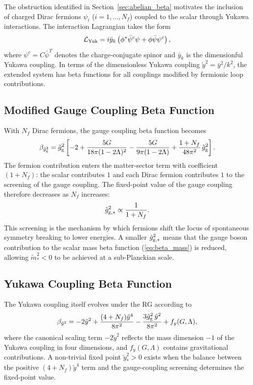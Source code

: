 \documentclass[12pt,a4paper]{article}
\begin{document}
The obstruction identified in Section~\ref{sec:abelian_beta} motivates the
inclusion of charged Dirac fermions $\psi_i$ ($i = 1,\ldots,N_f$) coupled to
the scalar through Yukawa interactions. The interaction Lagrangian takes the
form \cite{EichhornLinoMiqueleto2023}
\begin{equation}
\mathcal{L}_{\rm Yuk}
= i\bar y_k\left(\phi^*\bar\psi^c\psi + \phi\bar\psi\psi^c\right),
\end{equation}
where $\psi^c = C\bar\psi^T$ denotes the charge-conjugate spinor and $\bar y_k$
is the dimensionful Yukawa coupling. In terms of the dimensionless Yukawa
coupling $\tilde y^2 = \bar y^2/k^2$, the extended system has beta functions
for all couplings modified by fermionic loop contributions.

\subsection{Modified Gauge Coupling Beta Function}

With $N_f$ Dirac fermions, the gauge coupling beta function becomes
\begin{equation}
\beta_{\tilde g_{\rm g}^2}
= \tilde g_{\rm g}^2\left[
-2
+ \frac{5G}{18\pi(1-2\Lambda)^2}
- \frac{5G}{9\pi(1-2\Lambda)}
+ \frac{1+N_f}{48\pi^2}\,\tilde g_{\rm g}^2
\right].
\label{eq:beta_gauge_Nf}
\end{equation}
The fermion contribution enters the matter-sector term with coefficient
$(1+N_f)$: the scalar contributes $1$ and each Dirac fermion contributes
$1$ to the screening of the gauge coupling. The fixed-point value of the
gauge coupling therefore decreases as $N_f$ increases:
\begin{equation}
\tilde g_{\rm g,*}^2 \propto \frac{1}{1+N_f}.
\label{eq:gauge_fp_Nf}
\end{equation}
This screening is the mechanism by which fermions shift the locus of
spontaneous symmetry breaking to lower energies. A smaller $\tilde g_{\rm g,*}^2$
means that the gauge boson contribution to the scalar mass beta function
(\ref{eq:beta_mass}) is reduced, allowing $\tilde m^2_* < 0$ to be achieved
at a sub-Planckian scale.

\subsection{Yukawa Coupling Beta Function}

The Yukawa coupling itself evolves under the RG according to
\begin{equation}
\beta_{\tilde y^2}
= -2\tilde y^2
+ \frac{(4+N_f)\tilde y^4}{8\pi^2}
- \frac{3\tilde g_{\rm g}^2\,\tilde y^2}{8\pi^2}
+ f_y(G,\Lambda),
\end{equation}
where the canonical scaling term $-2\tilde y^2$ reflects the mass dimension $-1$
of the Yukawa coupling in four dimensions, and $f_y(G,\Lambda)$ contains
gravitational contributions. A non-trivial fixed point $\tilde y_*^2 > 0$
exists when the balance between the positive $(4+N_f)\tilde y^4$ term and the
gauge-coupling screening determines the fixed-point value.
\end{document}
